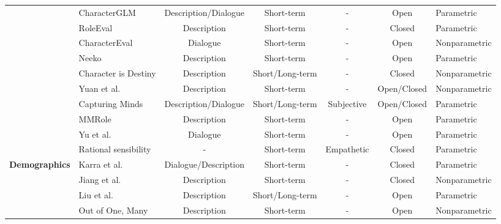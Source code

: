 \begin{table}[!htp]
{\begin{tabularx}{\linewidth}{c|>{\centering\arraybackslash}X|c|c|c|c|>{\centering\arraybackslash}m{8em}}
    \cmidrule{2-7}
    & CharacterGLM \cite{zhou2023characterglmcustomizingchineseconversational} & Description/Dialogue & Short-term & - & Open  & Parametric  \\
    \cmidrule{2-7}
    & RoleEval \cite{shen2024roleevalbilingualroleevaluation} & Description & Short-term & - & Closed  & Parametric  \\
    \cmidrule{2-7}
    & CharacterEval \cite{tu2024characterevalchinesebenchmarkroleplaying} & Dialogue & Short-term & - & Open  & Nonparametric  \\
    \cmidrule{2-7}
    & Neeko \cite{yu2024neekoleveragingdynamiclora} & Description & Short-term & - & Open  & Parametric  \\
    \cmidrule{2-7}
    & Character is Destiny \cite{xu2024characterdestinylargelanguage} & Description & Short/Long-term & - & Closed  & Nonparametric  \\
    \cmidrule{2-7}
    & Yuan et al. \cite{yuan2024evaluatingcharacterunderstandinglarge} & Description & Short-term & - & Open/Closed  & Nonparametric  \\
    \cmidrule{2-7}
    & Capturing Minds \cite{ran2024capturingmindsjustwords} & Description/Dialogue & Short/Long-term & Subjective & Open/Closed  & Parametric  \\
    \cmidrule{2-7}
    & MMRole \cite{dai2024mmrolecomprehensiveframeworkdeveloping} & Description & Short-term & - & Open  & Parametric  \\
    \cmidrule{2-7}
    & Yu et al. \cite{yu2024dialogueprofiledialoguealignmentframework} & Dialogue & Short-term & - & Open  & Parametric  \\
    \cmidrule{2-7}
    & Rational sensibility \cite{sun2023rational} & - & Short-term & Empathetic & Closed & Parametric \\
    \midrule
     \multirow[m]{35}{6em}{\textbf{Demographics}}& Karra et al.\cite{karra2023estimatingpersonalitywhiteboxlanguage} & Dialogue/Description & Short-term & - & Closed  & Parametric  \\
     \cmidrule{2-7}
    & Jiang et al. \cite{jiang2023evaluatinginducingpersonalitypretrained} & Description & Short-term & - & Closed  & Nonparametric  \\
    \cmidrule{2-7}
    & Liu et al. \cite{Liu_2022} & Description & Short/Long-term & - & Open  & Parametric  \\
    \cmidrule{2-7}
    & Out of One, Many \cite{Argyle_2023} & Description & Short-term & - & Open  & Nonparametric  \\

\end{tabularx}}
\end{table}
